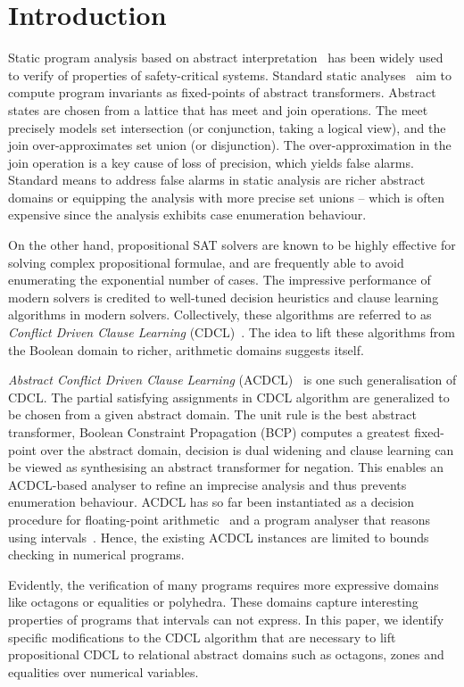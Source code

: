 \section{Introduction}

%
Static program analysis based on abstract interpretation~\cite{CC77} has
been widely used to verify of properties of safety-critical systems. 
Standard static analyses~\cite{se2011} aim to compute program invariants as
fixed-points of abstract transformers.  Abstract states are chosen from a
lattice that has meet and join operations.  The meet precisely models set
intersection (or conjunction, taking a logical view), and the join
over-approximates set union (or disjunction).  The over-approximation in the
join operation is a key cause of loss of precision, which yields false
alarms.  Standard means to address false alarms in static analysis are
richer abstract domains or equipping the analysis with more precise set
unions -- which is often expensive since the analysis exhibits case
enumeration behaviour.

%
On the other hand, propositional SAT solvers are known to be highly
effective for solving complex propositional formulae, and are frequently
able to avoid enumerating the exponential number of cases.  The impressive
performance of modern solvers is credited to well-tuned decision heuristics
and clause learning algorithms in modern solvers.  Collectively, these
algorithms are referred to as \emph{Conflict Driven Clause Learning}
(CDCL)~\cite{cdcl}. The idea to lift these algorithms from the Boolean
domain to richer, arithmetic domains suggests itself.

\emph{Abstract Conflict Driven Clause Learning} (ACDCL)~\cite{dhk2013-popl}
is one such generalisation of CDCL.  The partial satisfying assignments in
CDCL algorithm are generalized to be chosen from a given abstract domain. 
The unit rule is the best abstract transformer, Boolean Constraint
Propagation (BCP) computes a greatest fixed-point over the abstract domain,
decision is dual widening and clause learning can be viewed as synthesising
an abstract transformer for negation.  This enables an ACDCL-based analyser
to refine an imprecise analysis and thus prevents enumeration behaviour. 
ACDCL has so far been instantiated as a decision procedure for
floating-point arithmetic~\cite{DBLP:journals/fmsd/BrainDGHK14} and a
program analyser that reasons using intervals~\cite{tacas12}.  Hence, the
existing ACDCL instances are limited to bounds checking in numerical
programs.

Evidently, the verification of many programs requires more expressive
domains like octagons or equalities or polyhedra.  These domains capture
interesting properties of programs that intervals can not express.  In this
paper, we identify specific modifications to the CDCL algorithm that are
necessary to lift propositional CDCL to relational abstract domains such as
octagons, zones and equalities over numerical variables.
